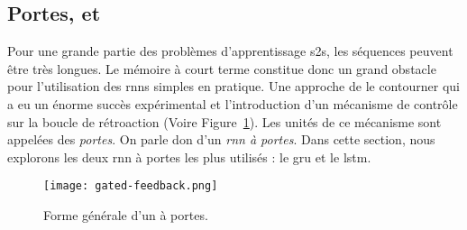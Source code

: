 \subsection{Portes,  et }

Pour une grande partie des problèmes d'apprentissage \gls{s2s}, les séquences peuvent être très longues.
Le mémoire à court terme constitue donc un grand obstacle pour l'utilisation des \glspl{rnn} simples en pratique.
Une approche de le contourner qui a eu un énorme succès expérimental 
et l'introduction d'un mécanisme de contrôle sur la boucle de rétroaction (Voire Figure~\ref{fig.rnn-gate}).
Les unités de ce mécanisme sont appelées des \emph{portes}.
On parle don d'un \emph{\gls{rnn} à portes}.
Dans cette section, nous explorons les deux \gls{rnn} à portes les plus utilisés :
le \gls{gru} et le \gls{lstm}. 


\begin{figure}[htb]
    \begin{center}
        \texttt{[image: gated-feedback.png]}
    \end{center}
    \caption{Forme générale d'un  à portes.}
    \label{fig.rnn-gate}
\end{figure}

\subsubsection{}